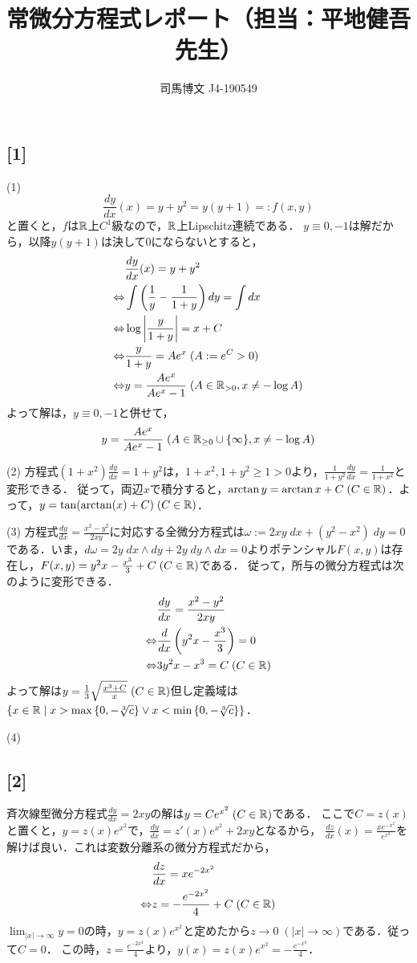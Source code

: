 \documentclass[uplatex,dvipdfmx]{jsarticle}
\title{常微分方程式レポート（担当：平地健吾先生）}
\author{司馬博文 J4-190549}
\begin{document}
\maketitle

\subsection*{[1]}
(1) 
\[ \frac{dy}{dx}(x) = y+y^2 = y(y+1) =: f(x,y) \]
と置くと，$f$は$\mathbb{R}$上$C^1$級なので，$\mathbb{R}$上Lipschitz連続である．
$y\equiv 0,-1$は解だから，以降$y(y+1)$は決して$0$にならないとすると，
\begin{align*}
    &\frac{dy}{dx}(x) = y+y^2\\
    \Leftrightarrow&\int\left(\frac{1}{y}-\frac{1}{1+y}\right)dy = \int dx\\
    \Leftrightarrow& \log\left|\frac{y}{1+y}\right| = x+C\\
    \Leftrightarrow& \frac{y}{1+y} = Ae^x\;(A:=e^C>0)\\
    \Leftrightarrow& y=\frac{Ae^x}{Ae^x-1}\;(A\in\mathbb{R}_{>0},x\ne -\log A)
\end{align*}
よって解は，$y\equiv 0,-1$と併せて，
\[y=\frac{Ae^x}{Ae^x-1}\;(A\in\mathbb{R}_{\ge 0}\cup\{\infty\},x\ne -\log A)\]

(2) 方程式$(1+x^2)\frac{dy}{dx}=1+y^2$は，$1+x^2,1+y^2\ge 1>0$より，$\frac{1}{1+y^2}\frac{dy}{dx}=\frac{1}{1+x^2}$と変形できる．
従って，両辺$x$で積分すると，$\arctan y=\arctan x+C\;(C\in\mathbb{R})$．よって，$y=\tan(\arctan(x)+C)\;(C\in\mathbb{R})$．

(3) 方程式$\frac{dy}{dx}=\frac{x^2-y^2}{2xy}$に対応する全微分方程式は$\omega:=2xy\;dx+(y^2-x^2)\;dy=0$である．いま，$d\omega=2y\;dx\wedge dy+2y\;dy\wedge dx=0$よりポテンシャル$F(x,y)$は存在し，$F(x,y)=y^2x-\frac{x^3}{3}+C\;(C\in\mathbb{R})$である．
従って，所与の微分方程式は次のように変形できる．
\begin{align*}
    &\frac{dy}{dx}=\frac{x^2-y^2}{2xy}\\
    \Leftrightarrow& \frac{d}{dx}\left(y^2x-\frac{x^3}{3}\right)=0\\
    \Leftrightarrow& 3y^2x-x^3=C\;(C\in\mathbb{R})
\end{align*}
よって解は$y=\frac{1}{3}\sqrt{\frac{x^3+C}{x}}\;(C\in\mathbb{R})$但し定義域は$\{x\in\mathbb{R}\mid x>\max\left\{0,-\sqrt[3]{c}\right\}\lor x<\min\left\{0,-\sqrt[3]{c}\right\} \}$．

(4) 

\subsection*{[2]}
斉次線型微分方程式$\frac{dy}{dx}=2xy$の解は$y=Ce^{x^2}\;(C\in\mathbb{R})$である．
ここで$C=z(x)$と置くと，$y=z(x)e^{x^2}$で，$\frac{dy}{dx}=z'(x)e^{x^2}+2xy$となるから，
$\frac{dz}{dx}(x)=\frac{xe^{-x^2}}{e^{x^2}}$を解けば良い．これは変数分離系の微分方程式だから，
\begin{align*}
    &\frac{dz}{dx}=xe^{-2x^2}\\
    \Leftrightarrow& z = -\frac{e^{-2x^2}}{4}+C\;(C\in\mathbb{R})
\end{align*}
$\lim_{|x|\to\infty}y=0$の時，$y=z(x)e^{x^2}$と定めたから$z\to 0\;(|x|\to\infty)$である．従って$C=0$．
この時，$z=\frac{e^{-2x^2}}{4}$より，$y(x)=z(x)e^{x^2}=-\frac{e^{-x^2}}{4}$．
\end{document}
